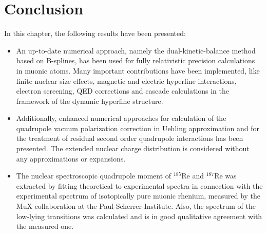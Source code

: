 \section{Conclusion}
\label{sec:muon_summary}
In this chapter, the following results have been presented:\\
\begin{itemize}
\setlength{\itemsep}{0.75cm}
\item An up-to-date numerical approach, namely the dual-kinetic-balance method based on B-splines, has been used for fully relativistic precision calculations in muonic atoms. Many important contributions have been implemented, like finite nuclear size effects, magnetic and electric hyperfine interactions, electron screening, QED corrections and cascade calculations in the framework of the dynamic hyperfine structure.
\item Additionally, enhanced numerical approaches for calculation of the quadrupole vacuum polarization correction in Uehling approximation and for the treatment of residual second order quadrupole interactions has been presented. The extended nuclear charge distribution is considered without any approximations or expansions.
\item  The nuclear spectroscopic quadrupole moment of $^{185}$Re and $^{187}$Re was extracted by fitting theoretical to experimental spectra in connection with the experimental spectrum of isotopically pure muonic rhenium, measured by the MuX collaboration at the Paul-Scherrer-Institute. Also, the spectrum of the low-lying transitions was calculated and is in good qualitative agreement with the measured one. 
\end{itemize}
